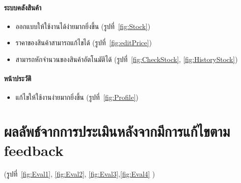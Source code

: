 \paragraph{ระบบคลังสินค้า}
\begin{itemize}
    \item ออกแบบให้ใช้งานได้ง่ายมากยิ่งขึ้น (รูปที่~\ref{fig:Stock})
    \item ราคาของสินค้าสามารถแก้ไขได้ (รูปที่~\ref{fig:editPrice})
    \item สามารถหักจำนวนของสินค้าอัตโนมัติได้ (รูปที่~\ref{fig:CheckStock}, \ref{fig:HistoryStock})
\end{itemize}
\paragraph{หน้าประวัติ}
\begin{itemize}
    \item แก้ไขให้ใช้งานง่ายมากยิ่งขึ้น (รูปที่~\ref{fig:Profile})
\end{itemize}

\section{ผลลัพธ์จากการประเมินหลังจากมีการแก้ไขตาม feedback}
(รูปที่~\ref{fig:Eval1}, \ref{fig:Eval2}, \ref{fig:Eval3},\ref{fig:Eval4} )


